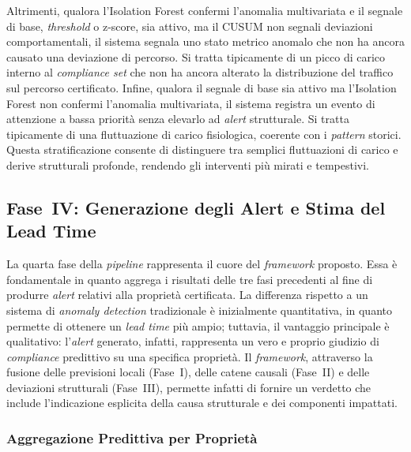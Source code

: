 Altrimenti, qualora l'Isolation Forest confermi l'anomalia multivariata e il segnale di base, 
\textit{threshold} o z-score, sia attivo, ma il \gls{CUSUM} non segnali deviazioni comportamentali, 
il sistema segnala uno stato metrico anomalo che non ha ancora causato una deviazione di percorso. 
Si tratta tipicamente di un picco di carico interno al \textit{compliance set} che non ha ancora 
alterato la distribuzione del traffico sul percorso certificato.
Infine, qualora il segnale di base sia attivo ma l'Isolation Forest non confermi l'anomalia multivariata, 
il sistema registra un evento di attenzione a bassa priorità senza elevarlo ad \textit{alert} strutturale.
Si tratta tipicamente di una fluttuazione di carico fisiologica, coerente con i \textit{pattern} storici.
Questa stratificazione consente di distinguere tra semplici fluttuazioni di carico e derive strutturali 
profonde, rendendo gli interventi più mirati e tempestivi.


\subsection{Fase~IV: Generazione degli Alert e Stima del Lead Time}
\label{sec:fase_4}

La quarta fase della \textit{pipeline} rappresenta il cuore del \textit{framework} proposto. Essa
è fondamentale in quanto aggrega i risultati delle tre fasi precedenti al fine di produrre
\textit{alert} relativi alla proprietà certificata. La differenza rispetto a un sistema di
\textit{anomaly detection} tradizionale è inizialmente quantitativa, in quanto permette di ottenere
un \textit{lead time} più ampio; tuttavia, il vantaggio principale è qualitativo: l'\textit{alert}
generato, infatti, rappresenta un vero e proprio giudizio di \textit{compliance} predittivo su una
specifica proprietà. Il \textit{framework}, attraverso la fusione delle previsioni locali (Fase~I),
delle catene causali (Fase~II) e delle deviazioni strutturali (Fase~III), permette infatti di
fornire un verdetto che include l'indicazione esplicita della causa strutturale e dei componenti
impattati.

\subsubsection{Aggregazione Predittiva per Proprietà}
\label{sec:aggregazione_predittiva}

